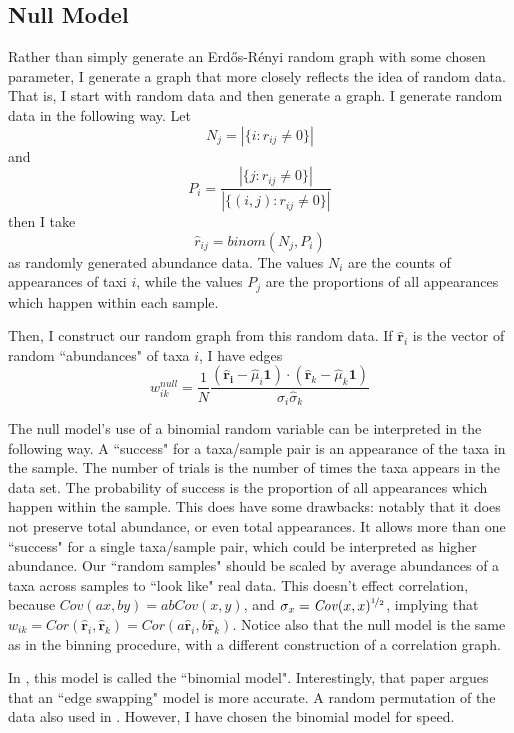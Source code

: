 \documentclass[10pt]{article}
\theoremstyle{definition}
\numberwithin{theorem}{section}
\numberwithin{definition}{section}
\numberwithin{lemma}{section}
\numberwithin{corollary}{section}
\numberwithin{clm}{section}
\numberwithin{rmk}{section}
\newcommand{\nhalf}{\nicefrac{1}{2}}
\renewcommand{\b}{\bm}
\begin{document}
\subsection{Null Model}\label{null}
Rather than simply generate an Erd\H{o}s-R\'{e}nyi random graph with some chosen parameter, I generate a graph that more closely reflects the idea of random data. That is, I start with random data and then generate a graph. I generate random data in the following way. Let 
\[
N_j = |\{i: r_{ij} \neq 0\}|
\]
and 
\[
P_i = \frac{|\{j: r_{ij}\neq 0 \}|}{|\{(i,j): r_{ij}\neq 0 \}|}
\]
then I take 
\[
\hat{r}_{ij} = \mathit{binom}(N_j,P_i)
\]
as randomly generated abundance data. The values $N_i$ are the counts of appearances of taxi $i$, while the values $P_j$ are the proportions of all appearances which happen within each sample. 
		
Then, I construct our random graph from this random data. If $\hat{\b{r}}_i$ is the vector of random ``abundances" of taxa $i$, I have edges
\[
w_{ik}^{null} = \frac{1}{N}\frac{(\b{\hat{\b{r}}_i}- \hat{\mu}_i\b{1}) \cdot (\hat{\b{r}}_k - \hat{\mu}_k\b{1})}{\hat{\sigma}_i \hat{\sigma}_k}
\]

The null model's use of a binomial random variable can be interpreted in the following way. A ``success" for a taxa/sample pair is an appearance of the taxa in the sample. The number of trials is the number of times the taxa appears in the data set. The probability of success is the proportion of all appearances which happen within the sample. This does have some drawbacks: notably that it does not preserve total abundance, or even total appearances. It allows more than one ``success" for a single taxa/sample pair, which could be interpreted as higher abundance. Our ``random samples" should be scaled by average abundances of a taxa across samples to ``look like" real data. This doesn't effect correlation, because $\mathit{Cov}(ax,by) = ab\mathit{Cov}(x,y)$, and $\sigma_x = \mathit{Cov}(x,x)^{\nhalf}$, implying that $w_{ik} = \mathit{Cor}(\hat{\b{r}}_i,\hat{\b{r}}_k) =  \mathit{Cor}(a\hat{\b{r}}_i,b\hat{\b{r}}_k)$. Notice also that the null model is the same as in the binning procedure, with a different construction of a correlation graph.

In \cite{coocc}, this model is called the ``binomial model". Interestingly, that paper argues that an ``edge swapping" model is more accurate. A random permutation of the data also used in \cite{gut}. However, I have chosen the binomial model for speed.
\end{document}
